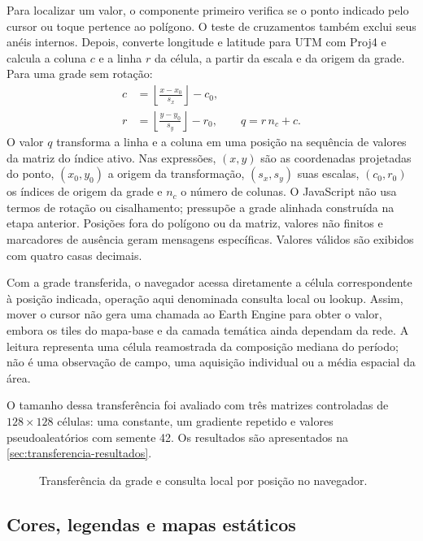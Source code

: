 Para localizar um valor, o componente primeiro verifica se o ponto indicado pelo cursor ou toque pertence ao polígono. O teste de cruzamentos também exclui seus anéis internos. Depois, converte longitude e latitude para UTM com Proj4 e calcula a coluna $c$ e a linha $r$ da célula, a partir da escala e da origem da grade. Para uma grade sem rotação:
\begin{align}
 c&=\left\lfloor\frac{x-x_0}{s_x}\right\rfloor-c_0,\\
 r&=\left\lfloor\frac{y-y_0}{s_y}\right\rfloor-r_0,\qquad q=r\,n_c+c.
\end{align}
O valor $q$ transforma a linha e a coluna em uma posição na sequência de valores da matriz do índice ativo. Nas expressões, $(x,y)$ são as coordenadas projetadas do ponto, $(x_0,y_0)$ a origem da transformação, $(s_x,s_y)$ suas escalas, $(c_0,r_0)$ os índices de origem da grade e $n_c$ o número de colunas. O JavaScript não usa termos de rotação ou cisalhamento; pressupõe a grade alinhada construída na etapa anterior. Posições fora do polígono ou da matriz, valores não finitos e marcadores de ausência geram mensagens específicas. Valores válidos são exibidos com quatro casas decimais.

Com a grade transferida, o navegador acessa diretamente a célula correspondente à posição indicada, operação aqui denominada consulta local ou lookup. Assim, mover o cursor não gera uma chamada ao Earth Engine para obter o valor, embora os tiles do mapa-base e da camada temática ainda dependam da rede. A leitura representa uma célula reamostrada da composição mediana do período; não é uma observação de campo, uma aquisição individual ou a média espacial da área.

O tamanho dessa transferência foi avaliado com três matrizes controladas de $128\times128$ células: uma constante, um gradiente repetido e valores pseudoaleatórios com semente 42. Os resultados são apresentados na \cref{sec:transferencia-resultados}.

\begin{figure}[htbp]
\centering
\resizebox{0.96\textwidth}{!}{}
\caption{Transferência da grade e consulta local por posição no navegador.}
\label{fig:fluxo-consulta-pixel}
\end{figure}

\subsection{Cores, legendas e mapas estáticos}

